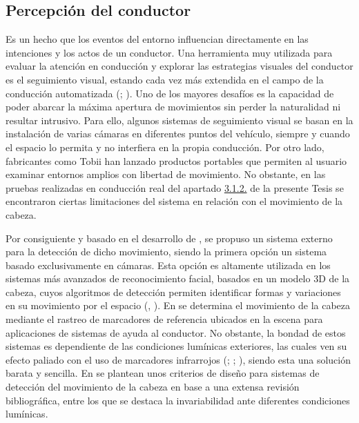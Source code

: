 \subsection{Percepción del conductor}\label{412}

Es un hecho que los eventos del entorno influencian directamente en las intenciones y los actos de un conductor. Una herramienta muy utilizada para evaluar la atención en conducción y explorar las estrategias visuales del conductor es el seguimiento visual, estando cada vez más extendida en el campo de la conducción automatizada (\cite{liang}; \cite{solismarcos}). Uno de los mayores desafíos es la capacidad de poder abarcar la máxima apertura de movimientos sin  perder la naturalidad ni resultar intrusivo. Para ello, algunos sistemas de seguimiento visual se basan en la instalación de varias cámaras en diferentes puntos del vehículo, siempre y cuando el espacio lo permita y no interfiera en la propia conducción. Por otro lado, fabricantes como Tobii han lanzado productos portables que permiten al usuario examinar entornos amplios con libertad de movimiento. No obstante, en las pruebas realizadas en conducción real del apartado \hyperref[312]{3.1.2.} de la presente Tesis se encontraron ciertas limitaciones del sistema en relación con el movimiento de la cabeza.   

Por consiguiente y basado en el desarrollo de \textcite{delafuente20}, se propuso un sistema externo para la detección de dicho movimiento, siendo la primera opción un sistema basado exclusivamente en cámaras. Esta opción es altamente utilizada en los sistemas más avanzados de reconocimiento facial, basados en un modelo 3D de la cabeza, cuyos algoritmos de detección permiten identificar formas y variaciones en su movimiento por el espacio (\cite{basu}, \cite{zajic}). En \textcite{langner} se determina el movimiento de la cabeza mediante el rastreo de marcadores de referencia ubicados en la escena para aplicaciones de sistemas de ayuda al conductor. No obstante, la bondad de estos sistemas es dependiente de las condiciones lumínicas exteriores, las cuales ven su efecto paliado con el uso de marcadores infrarrojos (\cite{li07}; \cite{murphy08}; \cite{feldstein}), siendo esta una solución barata y sencilla. En \textcite{murphy09} se plantean unos criterios de diseño para sistemas de detección del movimiento de la cabeza en base a una extensa revisión bibliográfica, entre los que se destaca la invariabilidad ante diferentes condiciones lumínicas.

